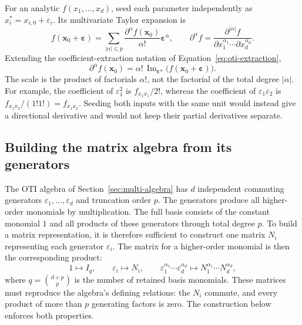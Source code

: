 For an analytic $f(x_1,\ldots,x_d)$, seed each parameter independently as
$x_i^*=x_{i,0}+\varepsilon_i$. Its multivariate Taylor expansion is
\begin{equation}
\label{eq:multi-taylor}
 f(\boldsymbol x_0+\boldsymbol\varepsilon)
 =\sum_{|\alpha|\leq p}
   \frac{\partial^\alpha f(\boldsymbol x_0)}{\alpha!}
   \boldsymbol\varepsilon^\alpha,\qquad
 \partial^\alpha f=
 \frac{\partial^{|\alpha|}f}
 {\partial x_1^{\alpha_1}\cdots\partial x_d^{\alpha_d}}.
\end{equation}
Extending the coefficient-extraction notation of Equation~\eqref{eq:oti-extraction},
\begin{equation}
\label{eq:multi-extraction}
 \boxed{\partial^\alpha f(\boldsymbol x_0)=
 \alpha!\,\operatorname{Im}_{\boldsymbol\varepsilon^\alpha}
 \bigl(f(\boldsymbol x_0+\boldsymbol\varepsilon)\bigr)}.
\end{equation}
The scale is the product of factorials $\alpha!$, not the factorial of the
total degree $|\alpha|$. For example, the coefficient of $\varepsilon_1^2$
is $f_{x_1x_1}/2!$, whereas the coefficient of
$\varepsilon_1\varepsilon_2$ is $f_{x_1x_2}/(1!1!)=f_{x_1x_2}$.
Seeding both inputs with the same unit would instead give a directional
derivative and would not keep their partial derivatives separate.

\newpage
\subsection{Building the matrix algebra from its generators}
\label{sec:multi-matrices}
The OTI algebra of Section~\ref{sec:multi-algebra} has $d$ independent
commuting generators $\varepsilon_1,\ldots,\varepsilon_d$ and truncation
order $p$. The generators produce all higher-order monomials by
multiplication. The full basis consists of the constant monomial $1$
and all products of these generators through total degree $p$.
To build a matrix representation, it is therefore sufficient to construct
one matrix $N_i$ representing each generator $\varepsilon_i$.
The matrix for a higher-order monomial is then the corresponding product:
\begin{equation}
 \label{eq:multi-monomial-matrices}
 1\longmapsto I_q,\qquad
 \varepsilon_i\longmapsto N_i,\qquad
 \varepsilon_1^{\alpha_1}\cdots\varepsilon_d^{\alpha_d}
 \longmapsto N_1^{\alpha_1}\cdots N_d^{\alpha_d},
\end{equation}
where $q=\binom{d+p}{p}$ is the number of retained basis monomials.
These matrices must reproduce the algebra's defining relations: the $N_i$
commute, and every product of more than $p$ generating factors is zero.
The construction below enforces both properties.

